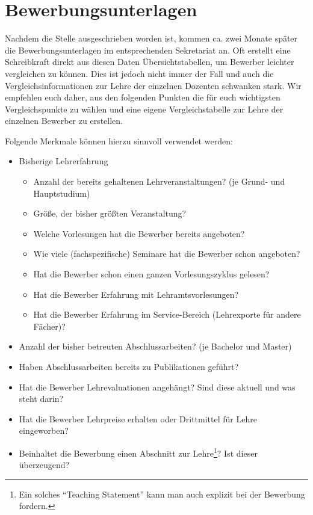 \section{Bewerbungsunterlagen}\thispagestyle{fancy}
Nachdem die Stelle ausgeschrieben worden ist, kommen ca. zwei Monate später die Bewerbungsunterlagen im entsprechenden Sekretariat an. Oft erstellt eine Schreibkraft direkt aus diesen Daten Übersichtstabellen, um Bewerber leichter vergleichen zu können. Dies ist jedoch nicht immer der Fall und auch die Vergleichsinformationen zur Lehre der einzelnen Dozenten schwanken stark. Wir empfehlen euch daher, aus den folgenden Punkten die für euch wichtigsten Vergleichspunkte zu wählen und eine eigene Vergleichstabelle zur Lehre der einzelnen Bewerber zu erstellen.

Folgende Merkmale können hierzu sinnvoll verwendet werden:
\begin{itemize}
    \item Bisherige Lehrerfahrung
    \begin{itemize}
        \item Anzahl der bereits gehaltenen Lehrveranstaltungen? (je Grund- und Hauptstudium)
        \item Größe, der bisher größten Veranstaltung?
        \item Welche Vorlesungen hat die Bewerber bereits angeboten?
        \item Wie viele (fachspezifische) Seminare hat die Bewerber schon angeboten?
        \item Hat die Bewerber schon einen ganzen Vorlesungszyklus gelesen?
        \item Hat die Bewerber Erfahrung mit Lehramtsvorlesungen?
        \item Hat die Bewerber Erfahrung im Service-Bereich (Lehrexporte für andere Fächer)?    
    \end{itemize}
    \item Anzahl der bisher betreuten Abschlussarbeiten? (je Bachelor und Master)
    \item Haben Abschlussarbeiten bereits zu Publikationen geführt?
    \item Hat die Bewerber Lehrevaluationen angehängt? Sind diese aktuell und was steht darin? 
    \item Hat die Bewerber Lehrpreise erhalten oder Drittmittel für Lehre eingeworben?
    \item Beinhaltet die Bewerbung einen Abschnitt zur Lehre\footnote{Ein solches \enquote{Teaching Statement} kann man auch explizit bei der Bewerbung fordern.}? Ist dieser überzeugend?
\end{itemize}

